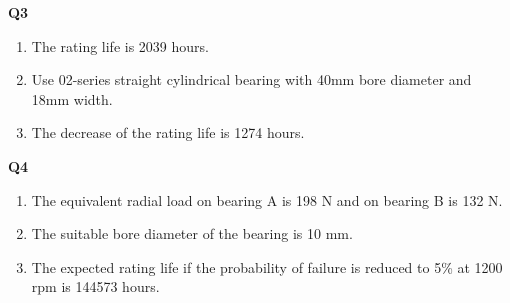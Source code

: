 \documentclass[a4paper, fleqn]{article}
\begin{document}
\textbf{Q3}
\begin{enumerate}[label=(\roman*)]
    \item The rating life is 2039 hours.
    \item Use 02-series straight cylindrical bearing with 40mm bore diameter and 18mm width.
    \item The decrease of the rating life is 1274 hours.
\end{enumerate}

\textbf{Q4}
\begin{enumerate}[label=(\roman*)]
    \item The equivalent radial load on bearing A is 198 N and on bearing B is 132 N.
    \item The suitable bore diameter of the bearing is 10 mm.
    \item The expected rating life if the probability of failure is reduced to 5\% at 1200 rpm is 144573 hours.
\end{enumerate}
\end{document}
